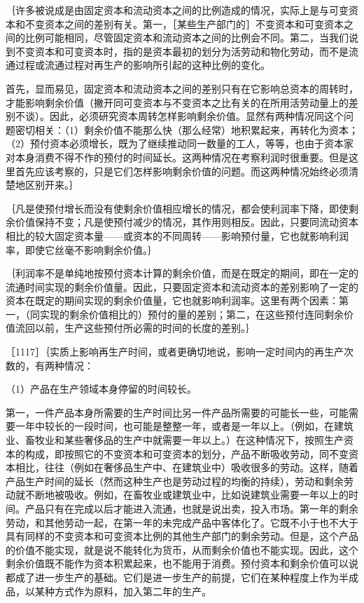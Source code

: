 ｛许多被说成是由固定资本和流动资本之间的比例造成的情况，实际上是与可变资本和不变资本之间的差别有关。第一，［某些生产部门的］不变资本和可变资本之间的比例可能相同，尽管固定资本和流动资本之间的比例会不同。第二，当我们说到不变资本和可变资本时，指的是资本最初的划分为活劳动和物化劳动，而不是流通过程或流通过程对再生产的影响所引起的这种比例的变化。

首先，显而易见，固定资本和流动资本之间的差别只有在它影响总资本的周转时，才能影响剩余价值（撇开同可变资本与不变资本之比有关的在所用活劳动量上的差别不谈）。因此，必须研究资本周转怎样影响剩余价值。显然有两种情况同这个问题密切相关：（1）剩余价值不能那么快（那么经常）地积累起来，再转化为资本；（2）预付资本必须增长，既为了继续推动同一数量的工人，等等，也由于资本家对本身消费不得不作的预付的时间延长。这两种情况在考察利润时很重要。但是这里首先应该考察的，只是它们怎样影响剩余价值的问题。而这两种情况始终必须清楚地区别开来。｝

｛凡是使预付增长而没有使剩余价值相应增长的情况，都会使利润率下降，即使剩余价值保持不变；凡是使预付减少的情况，其作用则相反。因此，只要同流动资本相比的较大固定资本量——或资本的不同周转——影响预付量，它也就影响利润率，即使它丝毫不影响剩余价值。｝

｛利润率不是单纯地按预付资本计算的剩余价值，而是在既定的期间，即在一定的流通时间实现的剩余价值量。因此，只要固定资本和流动资本的差别影响了一定的资本在既定的期间实现的剩余价值量，它也就影响利润率。这里有两个因素：第一，（同实现的剩余价值相比的）预付的量的差别；第二，在这些预付连同剩余价值流回以前，生产这些预付所必需的时间的长度的差别。｝

［1117］｛实质上影响再生产时间，或者更确切地说，影响一定时间内的再生产次数的，有两种情况：

（1）产品在生产领域本身停留的时间较长。

第一，一件产品本身所需要的生产时间比另一件产品所需要的可能长一些，可能需要一年中较长的一段时间，也可能是整整一年，或者是一年以上。（例如，在建筑业、畜牧业和某些奢侈品的生产中就需要一年以上。）在这种情况下，按照生产资本的构成，即按照它的不变资本和可变资本的划分，产品不断吸收劳动，同不变资本相比，往往（例如在奢侈品生产中、在建筑业中）吸收很多的劳动。这样，随着产品生产时间的延长（然而这种生产也是劳动过程的均衡的持续），劳动和剩余劳动就不断地被吸收。例如，在畜牧业或建筑业中，比如说建筑业需要一年以上的时间。产品只有在完成以后才能进入流通，也就是说出卖，投入市场。第一年的剩余劳动，和其他劳动一起，在第一年的未完成产品中客体化了。它既不小于也不大于具有同样的不变资本和可变资本比例的其他生产部门的剩余劳动。但是，这个产品的价值不能实现，就是说不能转化为货币，从而剩余价值也不能实现。因此，这个剩余价值既不能作为资本积累起来，也不能用于消费。预付资本和剩余价值可以说都成了进一步生产的基础。它们是进一步生产的前提，它们在某种程度上作为半成品，以某种方式作为原料，加入第二年的生产。


